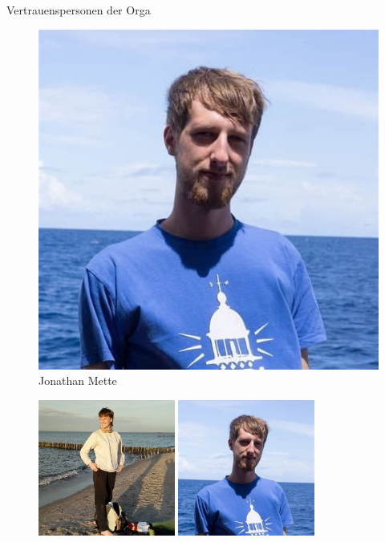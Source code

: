 \documentclass[compress, aspectratio=169]{beamer}
\begin{document}
\begin{frame}{Vertrauenspersonen der Orga}
\hspace{0.1\textwidth}
\begin{minipage}{0.4\textwidth}
	\begin{figure}
		\begin{minipage}[c]{.65\textwidth}
			\includegraphics[height=0.5\textheight]{jonam.jpg}
		\end{minipage} \hfill
		\begin{minipage}[c]{.632\textwidth}
			\caption*{Jonathan Mette}
		\end{minipage}
	\end{figure}
\end{minipage}
\hspace{0.1\textwidth}

\begin{figure}[h!]
       \centering
       \includegraphics[width=0.4\textwidth]{wandaw.jpg}
       \hfill
       \centering
       \includegraphics[width=0.4\textwidth]{jonam.jpg}
   \end{figure}   
\end{frame}
\end{document}
